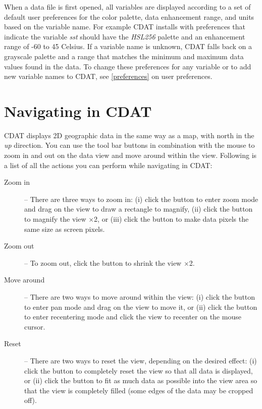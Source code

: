 When a data file is first opened, all variables are displayed
according to a set of default user preferences for the color palette,
data enhancement range, and units based on the variable name.  For
example CDAT installs with preferences that indicate the variable {\em
sst} should have the {\em HSL256} palette and an enhancement range of
-60 to 45 Celsius.  If a variable name is unknown, CDAT falls back on
a grayscale palette and a range that matches the minimum and maximum
data values found in the data.  To change these preferences for any
variable or to add new variable names to CDAT, see
\autoref{preferences} on user preferences.


\section{Navigating in CDAT}

CDAT displays 2D geographic data in the same way as a map, with
north in the {\em up} direction.  You can use the tool bar
buttons in combination with the mouse to zoom in and out on the
data view and move around within the view.  Following is a list
of all the actions you can perform while navigating in CDAT:
\begin{description}

\item[Zoom in] -- There are three ways to zoom in: (i) click
the  button to enter zoom mode and
drag on the view to draw a rectangle to magnify, (ii) click the
 button to magnify the view $\times$2,
or (iii) click the  button to make data
pixels the same size as screen pixels.

\item[Zoom out] -- To zoom out, click the
 button to shrink the view $\times$2.

\item[Move around] -- There are two ways to move around
within the view: (i) click the  button to
enter pan mode and drag on the view to move it, or (ii) click the
 button to enter recentering mode and
click the view to recenter on the mouse cursor.

\item[Reset] -- There are two ways to reset the view,
depending on the desired effect: (i) click the
 button to completely reset the view so that
all data is displayed, or (ii) click the
 button to fit as much data as possible
into the view area so that the view is completely filled (some
edges of the data may be cropped off).

\end{description}

